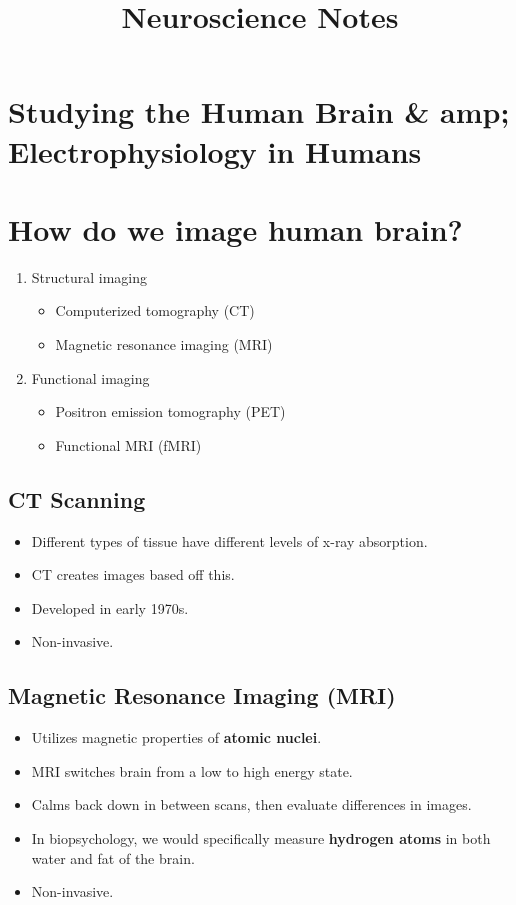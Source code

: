 \documentclass[12pt,a4paper]{article}
\title{\textbf{Neuroscience Notes}}
\author{}
\date{}
\begin{document}
	
	\maketitle
	\tableofcontents
	\newpage
	
	\section*{Studying the Human Brain \& amp; Electrophysiology in Humans}
	
	\section{How do we image human brain?}
	
	\begin{enumerate}
		\item Structural imaging 
		\begin{itemize}
			\item Computerized tomography (CT)
			\item Magnetic resonance imaging (MRI)
		\end{itemize}
		\item Functional imaging 
		\begin{itemize}
			\item Positron emission tomography (PET)
			\item Functional MRI (fMRI)
		\end{itemize}
	\end{enumerate}
	
	\subsection{CT Scanning}
	
	\begin{itemize}
		\item Different types of tissue have different levels of x-ray absorption. 
		\item CT creates images based off this. 
		\item Developed in early 1970s. 
		\item Non-invasive. 
	\end{itemize}
	
	\subsection{Magnetic Resonance Imaging (MRI)}
	
	\begin{itemize}
		\item Utilizes magnetic properties of \textbf{atomic nuclei}.
		\item MRI switches brain from a low to high energy state. 
		\item Calms back down in between scans, then evaluate differences in images. 
		\item In biopsychology, we would specifically measure \textbf{hydrogen atoms} in both water and fat of the brain. 
		\item Non-invasive. 
	\end{itemize}
	
\end{document}
